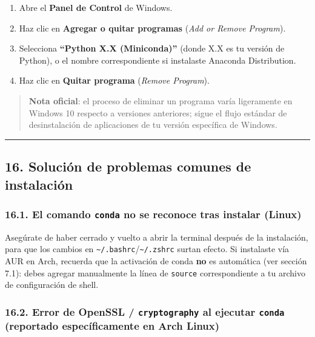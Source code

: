 \documentclass[
  doc,
  floatsintext,
  longtable,
  a4paper,
  nolmodern,
  notxfonts,
  notimes,
  12pt,
  colorlinks=true,linkcolor=blue,citecolor=blue,urlcolor=blue]{apa7}
\providecommand{\tightlist}{%
  \setlength{\itemsep}{0pt}\setlength{\parskip}{0pt}}
\begin{document}
\begin{enumerate}
\def\labelenumi{\arabic{enumi}.}
\tightlist
\item
  Abre el \textbf{Panel de Control} de Windows.
\item
  Haz clic en \textbf{Agregar o quitar programas} (\emph{Add or Remove
  Program}).
\item
  Selecciona \textbf{``Python X.X (Miniconda)''} (donde X.X es tu
  versión de Python), o el nombre correspondiente si instalaste Anaconda
  Distribution.
\item
  Haz clic en \textbf{Quitar programa} (\emph{Remove Program}).
\end{enumerate}

\begin{quote}
\textbf{Nota oficial}: el proceso de eliminar un programa varía
ligeramente en Windows 10 respecto a versiones anteriores; sigue el
flujo estándar de desinstalación de aplicaciones de tu versión
específica de Windows.
\end{quote}

\begin{center}\rule{0.5\linewidth}{0.5pt}\end{center}

\subsection{16. Solución de problemas comunes de
instalación}\label{soluciuxf3n-de-problemas-comunes-de-instalaciuxf3n}

\subsubsection{\texorpdfstring{16.1. El comando \texttt{conda} no se
reconoce tras instalar
(Linux)}{16.1. El comando conda no se reconoce tras instalar (Linux)}}\label{el-comando-conda-no-se-reconoce-tras-instalar-linux}

Asegúrate de haber cerrado y vuelto a abrir la terminal después de la
instalación, para que los cambios en
\texttt{\textasciitilde{}/.bashrc}/\texttt{\textasciitilde{}/.zshrc}
surtan efecto. Si instalaste vía AUR en Arch, recuerda que la activación
de conda \textbf{no} es automática (ver sección 7.1): debes agregar
manualmente la línea de \texttt{source} correspondiente a tu archivo de
configuración de shell.

\subsubsection{\texorpdfstring{16.2. Error de OpenSSL /
\texttt{cryptography} al ejecutar \texttt{conda} (reportado
específicamente en Arch
Linux)}{16.2. Error de OpenSSL / cryptography al ejecutar conda (reportado específicamente en Arch Linux)}}\label{error-de-openssl-cryptography-al-ejecutar-conda-reportado-especuxedficamente-en-arch-linux}
\end{document}
